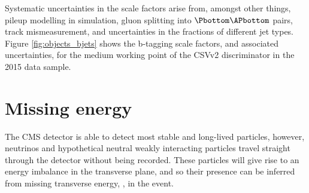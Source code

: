 Systematic uncertainties in the scale factors arise from, amongst other things,
pileup modelling in simulation, gluon splitting into $\Pbottom\APbottom$ pairs, track mismeasurement,
and uncertainties in the fractions of different jet types.
Figure \ref{fig:objects_bjets} shows the b-tagging scale factors, and associated uncertainties,
for the medium working point of the \ac{CSV}v2 discriminator in the
2015 data sample.

\section{Missing energy}
\label{sec:objects_met}
The \ac{CMS} detector is able to detect most stable and long-lived particles,
however, neutrinos and hypothetical neutral weakly interacting particles
travel straight through the detector without being recorded. These particles
will give rise to an energy imbalance in the transverse plane, and so their
presence can be inferred from missing transverse energy, \MET, in the event. 

